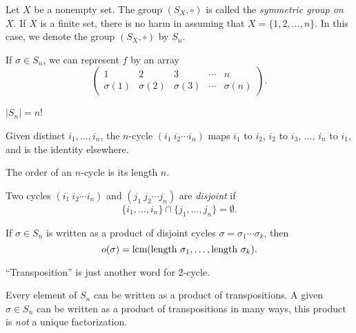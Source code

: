 \begin{definition}
	Let $X$ be a nonempty set. The group $(S_X, \circ)$ is called the
	\emph{symmetric group on $X$}. If $X$ is a finite set, there is no harm in
	assuming that $X = \{1, 2, \dots, n\}$. In this case, we denote the group
	$(S_X, \circ)$ by $S_n$.
\end{definition}

\begin{notation}
	If $\sigma \in S_n$, we can represent $f$ by an array
	\[
		\begin{pmatrix}
			1 & 2 & 3 & \cdots & n \\
			\sigma(1) & \sigma(2) & \sigma(3) & \cdots & \sigma(n)
		\end{pmatrix}.
	\]
\end{notation}

\begin{fact}
	$|S_n| = n$!
\end{fact}

\begin{definition}
	Given distinct $i_1, \dots, i_n$, the $n$-cycle $(i_1 \ i_2 \cdots i_n)$ maps
	$i_1$ to $i_2$, $i_2$ to $i_3$, $\dots$, $i_n$ to $i_1$, and is the identity
	elsewhere.
\end{definition}

\begin{fact}
	The order of an $n$-cycle is its length $n$.
\end{fact}

\begin{definition}
	Two cycles $(i_1 \ i_2 \cdots i_n)$ and $(j_1 \ j_2 \cdots j_n)$ are
	\emph{disjoint} if
	\[
		\{i_1, \dots, i_n\} \cap \{j_1, \dots, j_n\} = \emptyset.
	\]
\end{definition}

\begin{fact}
	If $\sigma \in S_n$ is written as a product of disjoint cycles $\sigma =
	\sigma_1 \cdots \sigma_k$, then
	\[
		o(\sigma) = \text{lcm}(\text{length } \sigma_1, \dots, \text{length } \sigma_k).
	\]
\end{fact}

\begin{definition}
	``Transposition'' is just another word for 2-cycle.
\end{definition}

\begin{fact}
	Every element of $S_n$ can be written as a product of transpositions. A given
	$\sigma \in S_n$ can be written as a product of transpositions in many ways,
	this product is \emph{not} a unique factorization.
\end{fact}


